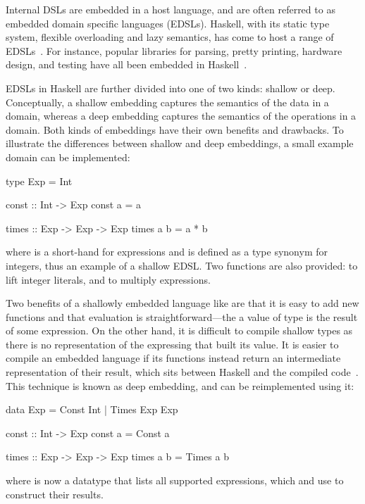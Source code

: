 \documentclass[../paper.tex]{subfiles}
\begin{document}
Internal DSLs are embedded in a host language, and are often referred to as embedded domain specific languages (EDSLs). Haskell, with its static type system, flexible overloading and lazy semantics, has come to host a range of EDSLs~\cite{elliott2003}. For instance, popular libraries for parsing, pretty printing, hardware design, and testing have all been embedded in Haskell~\cite{leijen2002, hughes1995, bjesse1998}.

EDSLs in Haskell are further divided into one of two kinds: shallow or deep. Conceptually, a shallow embedding captures the semantics of the data in a domain, whereas a deep embedding captures the semantics of the operations in a domain. Both kinds of embeddings have their own benefits and drawbacks. To illustrate the differences between shallow and deep embeddings, a small example domain can be implemented:

\begin{code}
type Exp = Int

const :: Int -> Exp
const a = a

times :: Exp -> Exp -> Exp
times a b = a * b
\end{code}

\noindent where  is a short-hand for expressions and is defined as a type synonym for integers, thus an example of a shallow EDSL. Two functions are also provided:  to lift integer literals, and  to multiply expressions.

Two benefits of a shallowly embedded language like  are that it is easy to add new functions and that evaluation is straightforward---the a value of type  is the result of some expression. On the other hand, it is difficult to compile shallow types as there is no representation of the expressing that built its value. It is easier to compile an embedded language if its functions instead return an intermediate representation of their result, which sits between Haskell and the compiled code~\cite{elliott2003}. This technique is known as deep embedding, and  can be reimplemented using it:

\begin{code}
data Exp = Const Int | Times Exp Exp

const :: Int -> Exp
const a = Const a

times :: Exp -> Exp -> Exp
times a b = Times a b
\end{code}

\noindent where  is now a datatype that lists all supported expressions, which  and  use to construct their results.
\end{document}
